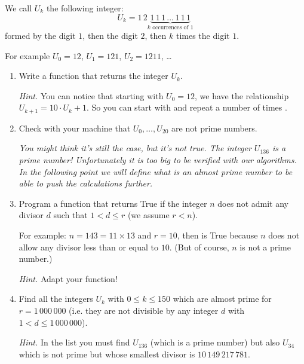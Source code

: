 \documentclass[11pt,class=report,crop=false]{standalone}
\begin{document}

\begin{activite}


We call $U_k$ the following integer:
$$U_k = 1\,2 \underbrace{1\,1\,1\,\ldots\,1\,1\,1}_{k \text{ occurrences of } 1}$$
formed by the digit $1$, then the digit $2$, then $k$ times the digit $1$.

For example $U_0 = 12$, $U_1 = 121$, $U_2 = 1211$, \ldots




\begin{enumerate}
  \item Write a function  that returns the integer $U_k$.
  
  \emph{Hint.} You can notice that starting with $U_0=12$, we have the relationship
  $U_{k+1} = 10 \cdot U_k + 1$. So you can start with  and repeat a number of times .
  
  \item Check with your machine that $U_0,\ldots,U_{20}$ are not prime numbers. 
  
  \medskip
  
 \emph{You might think it's still the case, but it's not true. The integer $U_{136}$ is a prime number! Unfortunately it is too big to be verified with our algorithms. In the following point we will define what is an \emph{almost prime number} to be able to push the calculations further.}
  
  \item Program a function  that returns \og{}True\fg{} if the integer $n$ does not admit any divisor $d$ such that $1< d \le r$ (we assume $r<n$). 
  
  For example: $n = 143 = 11 \times 13$ and $r=10$, then  is
  \og{}True\fg{} because $n$ does not allow any divisor less than or equal to $10$. (But of course, $n$ is not a prime number.)
  
  \emph{Hint.} Adapt your  function!
  
  \item Find all the integers $U_k$ with $0\le k \le 150$ which are almost prime for 
  $r = 1 \,000\,000$ (i.e. they are not divisible by any integer $d$ with $1<d \le 1\,000\,000$).
  
  \emph{Hint.} In the list you must find $U_{136}$ (which is a prime number) but also $U_{34}$ which is not prime but whose smallest divisor is
  $10\,149\,217\,781$.
\end{enumerate}   
     
\end{activite}
\end{document}
